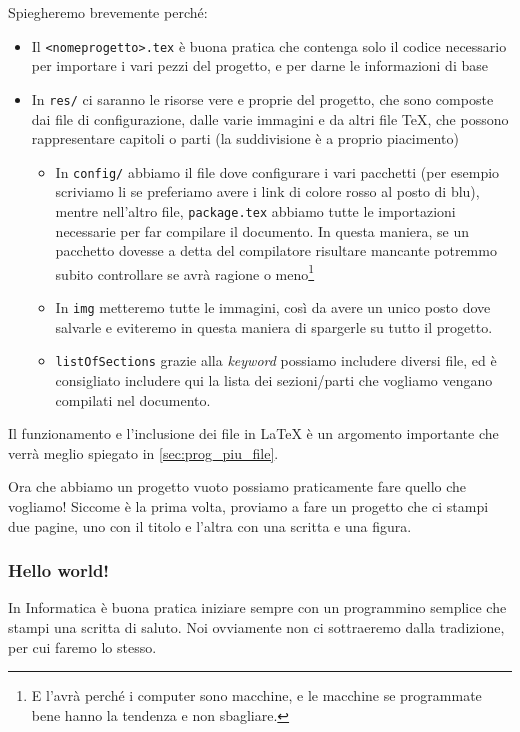 Spiegheremo brevemente perché:
\begin{itemize}
  \item Il \texttt{<nomeprogetto>.tex} è buona pratica che contenga solo il
codice necessario per importare i vari pezzi del progetto, e per darne le
informazioni di base
  \item In \texttt{res/} ci saranno le risorse vere e proprie del progetto, che
sono composte dai file di configurazione, dalle varie immagini e da altri file
TeX, che possono rappresentare capitoli o parti (la suddivisione è a proprio
piacimento)
  \begin{itemize}
   \item In \texttt{config/} abbiamo il file dove configurare i vari pacchetti
(per esempio scriviamo li se preferiamo avere i link di colore rosso al posto
di blu), mentre nell'altro file, \texttt{package.tex} abbiamo tutte le
importazioni necessarie per far compilare il documento. In questa maniera, se
un pacchetto dovesse a detta del compilatore risultare mancante potremmo subito
controllare se avrà ragione o meno\footnote{E l'avrà perché i computer sono
macchine, e le macchine se programmate bene hanno la tendenza e non sbagliare.}
  \item In \texttt{img} metteremo tutte le immagini, così da avere un unico
posto dove salvarle e eviteremo in questa maniera di spargerle su tutto il
progetto.
  \item \texttt{listOfSections} grazie alla \textit{keyword} \verb!!
possiamo includere diversi file, ed è consigliato includere qui la lista dei
sezioni/parti che vogliamo vengano compilati nel documento.
  \end{itemize}
\end{itemize}

Il funzionamento e l'inclusione dei file in \LaTeX{} è un argomento importante
che verrà meglio spiegato in \ref{sec:prog_piu_file}.

Ora che abbiamo un progetto vuoto possiamo praticamente fare quello che
vogliamo! Siccome è la prima volta, proviamo a fare un progetto che ci stampi
due pagine, uno con il titolo e l'altra con una scritta e una figura.

\subsubsection{Hello world!}

In Informatica è buona pratica iniziare sempre con un programmino semplice che
stampi una scritta di saluto. Noi ovviamente non ci sottraeremo dalla
tradizione, per cui faremo lo stesso.

